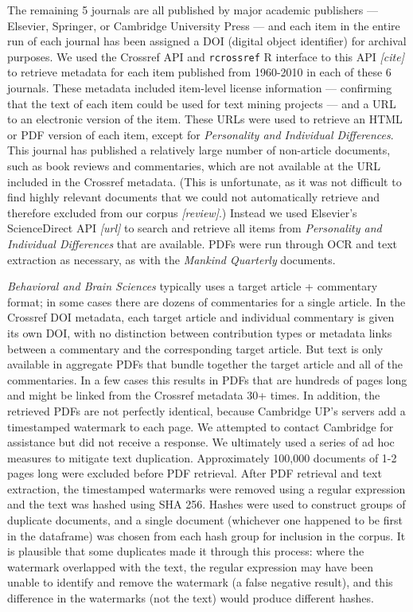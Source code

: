\documentclass[12pt]{article}
\begin{document}
The remaining 5 journals are all published by major academic publishers --- Elsevier, Springer, or Cambridge University Press --- and each item in the entire run of each journal has been assigned a DOI (digital object identifier) for archival purposes. We used the Crossref API and \texttt{rcrossref} R interface to this API \emph{{[}cite{]}} to retrieve metadata for each item published from 1960-2010 in each of these 6 journals. These metadata included item-level license information --- confirming that the text of each item could be used for text mining projects --- and a URL to an electronic version of the item. These URLs were used to retrieve an HTML or PDF version of each item, except for \emph{Personality and Individual Differences}. This journal has published a relatively large number of non-article documents, such as book reviews and commentaries, which are not available at the URL included in the Crossref metadata. (This is unfortunate, as it was not difficult to find highly relevant documents that we could not automatically retrieve and therefore excluded from our corpus \emph{{[}review{]}}.) Instead we used Elsevier's ScienceDirect API \emph{{[}url{]}} to search and retrieve all items from \emph{Personality and Individual Differences} that are available. PDFs were run through OCR and text extraction as necessary, as with the \emph{Mankind Quarterly} documents.

\emph{Behavioral and Brain Sciences} typically uses a target article + commentary format; in some cases there are dozens of commentaries for a single article. In the Crossref DOI metadata, each target article and individual commentary is given its own DOI, with no distinction between contribution types or metadata links between a commentary and the corresponding target article. But text is only available in aggregate PDFs that bundle together the target article and all of the commentaries. In a few cases this results in PDFs that are hundreds of pages long and might be linked from the Crossref metadata 30+ times. In addition, the retrieved PDFs are not perfectly identical, because Cambridge UP's servers add a timestamped watermark to each page. We attempted to contact Cambridge for assistance but did not receive a response. We ultimately used a series of ad hoc measures to mitigate text duplication. Approximately 100,000 documents of 1-2 pages long were excluded before PDF retrieval. After PDF retrieval and text extraction, the timestamped watermarks were removed using a regular expression and the text was hashed using SHA 256. Hashes were used to construct groups of duplicate documents, and a single document (whichever one happened to be first in the dataframe) was chosen from each hash group for inclusion in the corpus. It is plausible that some duplicates made it through this process: where the watermark overlapped with the text, the regular expression may have been unable to identify and remove the watermark (a false negative result), and this difference in the watermarks (not the text) would produce different hashes.
\end{document}

